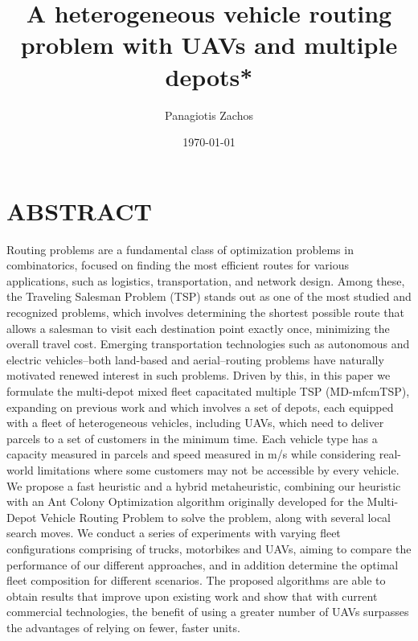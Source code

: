 \documentclass{article}
\title{A heterogeneous vehicle routing problem with UAVs and multiple depots*}
\author{Panagiotis Zachos}
\date{\today}
\begin{document}
	\maketitle
	\section*{ABSTRACT}
	Routing problems are a fundamental class of optimization problems in combinatorics, focused on finding the most efficient routes for various applications, such as logistics, transportation, and network design. Among these, the Traveling Salesman Problem (TSP) stands out as one of the most studied and recognized problems, which involves determining the shortest possible route that allows a salesman to visit each destination point exactly once, minimizing the overall travel cost. Emerging transportation technologies such as autonomous and electric vehicles--both land-based and aerial--routing problems have naturally motivated renewed interest in such problems. 
	Driven by this, in this paper we formulate the multi-depot mixed fleet capacitated multiple TSP (MD-mfcmTSP), expanding on previous work and which involves a set of depots, each equipped with a fleet of heterogeneous vehicles, including UAVs, which need to deliver parcels to a set of customers in the minimum time. Each vehicle type has a capacity measured in parcels and speed measured in m/s while considering real-world limitations where some customers may not be accessible by every vehicle. We propose a fast heuristic and a hybrid metaheuristic, combining our heuristic with an Ant Colony Optimization algorithm originally developed for the Multi-Depot Vehicle Routing Problem to solve the problem, along with several local search moves. We conduct a series of experiments with varying fleet configurations comprising of trucks, motorbikes and UAVs, aiming to compare the performance of our different approaches, and in addition determine the optimal fleet composition for different scenarios. The proposed algorithms are able to obtain results that improve upon existing work and show that with current commercial technologies, the benefit of using a greater number of UAVs surpasses the advantages of relying on fewer, faster units.
	\par
\end{document}
